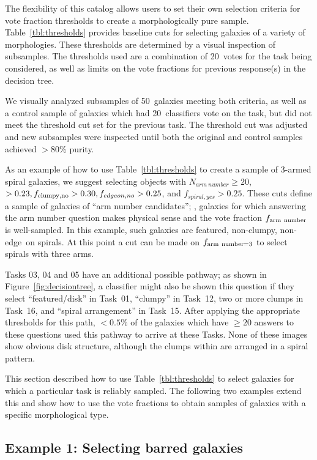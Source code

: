 \documentclass[twocolumn]{aastex6}
\begin{document}
The flexibility of this catalog allows users to set their own selection
criteria for vote fraction thresholds to create a morphologically pure sample.
Table~\ref{tbl:thresholds} provides baseline cuts for selecting galaxies of a
variety of morphologies. These thresholds are determined by a visual inspection
of subsamples. The thresholds used are a combination of 20~votes for the
task being considered, as well as limits on the vote fractions for previous
response(s) in the decision tree. 

We visually analyzed subsamples of 50~galaxies meeting both
criteria, as well as a control sample of galaxies which had 20~classifiers vote on
the task, but did not meet the threshold cut set for the previous task. The
threshold cut was adjusted and new subsamples were inspected until both the
original and control samples achieved $>80\%$ purity.

As an example of how to use Table~\ref{tbl:thresholds} to create a sample of
3-armed spiral galaxies, we suggest selecting objects with $N_{arm~number} \ge
20$, \ffeatures$>0.23, f_{\rm clumpy,no} > 0.30, f_{edgeon,no}>0.25$, and
$f_{spiral,yes}>0.25$. These cuts define a sample of galaxies of ``arm number
candidates''; \ie, galaxies for which answering the arm number question makes
physical sense and the vote fraction $f_{\rm arm~number}$ is well-sampled. In
this example, such galaxies are featured, non-clumpy, non-edge~on spirals. At
this point a cut can be made on $f_{\rm arm~number=3}$ to select spirals with
three arms. 

Tasks 03, 04 and 05 have an additional possible pathway; as shown in
Figure~\ref{fig:decisiontree}, a classifier might also be shown this question
if they select ``featured/disk'' in Task~01, ``clumpy'' in Task~12, two or more
clumps in Task~16, and ``spiral arrangement'' in Task~15. After applying
the appropriate thresholds for this path, $< 0.5\%$ of the galaxies which
have $\ge 20$ answers to these questions used this pathway to arrive at
these Tasks. None of these images show obvious disk
structure, although the clumps within are arranged in a spiral pattern. 

This section described how to use Table~\ref{tbl:thresholds} to select
galaxies for which a particular task is reliably sampled. The
following two examples extend this and show how to use the vote fractions to
obtain samples of galaxies with a specific morphological type.

\subsection{Example 1: Selecting barred galaxies} 
\end{document}
